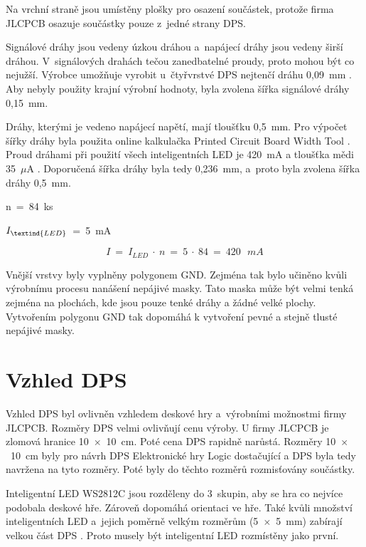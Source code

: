   Na vrchní straně jsou umístěny plošky pro osazení součástek, protože firma JLCPCB osazuje součástky pouze z~jedné strany DPS.

  Signálové dráhy jsou vedeny úzkou dráhou a~napájecí dráhy jsou vedeny širší dráhou. V~signálových drahách tečou zanedbatelné 
  proudy, proto mohou být co nejužší. Výrobce umožňuje vyrobit u~čtyřvrstvé DPS nejtenčí dráhu 0,09~mm \cite{JLCPCB_Capabilities}. 
  Aby nebyly použity krajní výrobní hodnoty, byla zvolena šířka signálové dráhy 0,15~mm.

  Dráhy, kterými je vedeno napájecí napětí, mají tloušťku 0,5~mm. Pro výpočet šířky dráhy byla použita online kalkulačka Printed
  Circuit Board Width Tool \cite{Kalkulacka_drahy_DPS}. Proud dráhami při použití všech inteligentních LED je 420~mA a tloušťka 
  mědi 35~$\mu$A \cite{JLCPCB_Capabilities}. Doporučená šířka dráhy byla tedy 0,236~mm, a~proto byla zvolena šířka dráhy 0,5~mm.

  n~=~84~ks

  $I_\textind{LED}$~=~5~mA 

  \begin{equation} 
    I~=~I_{LED}~\cdot~n~=~5~\cdot~84~=~420~\:~mA
  \end{equation}

  Vnější vrstvy byly vyplněny polygonem GND. Zejména tak bylo učiněno kvůli výrobnímu procesu nanášení nepájivé masky. Tato maska
  může být velmi tenká zejména na plochách, kde jsou pouze tenké dráhy a žádné velké plochy. Vytvořením polygonu GND tak dopomáhá k 
  vytvoření pevné a stejně tlusté nepájivé masky. 

  \section{Vzhled DPS}
  Vzhled DPS byl ovlivněn vzhledem deskové hry a~výrobními možnostmi firmy JLCPCB. Rozměry DPS velmi ovlivňují cenu výroby. U firmy 
  JLCPCB je zlomová hranice 10~$\times$~10~cm. Poté cena DPS rapidně narůstá. Rozměry 10~$\times$~10~cm byly pro návrh DPS Elektronické 
  hry Logic dostačující a DPS byla tedy navržena na tyto rozměry. Poté byly do těchto rozměrů rozmisťovány součástky. 

  Inteligentní LED WS2812C jsou rozděleny do 3~skupin, aby se hra co nejvíce podobala deskové hře. Zároveň dopomáhá orientaci ve hře.
  Také kvůli množství inteligentních LED a~jejich poměrně velkým rozměrům (5~$\times$~5~mm) zabírají velkou část DPS 
  \cite{WS2812C_datasheet}. Proto musely být inteligentní LED rozmístěny jako první.

